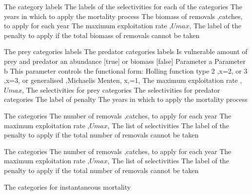 \par\textbf{}\par
{} {The category labels}
 {The labels of the selectivities for each of the categories}
 {The years in which to apply the mortality process}
 {The biomass of removals ,catches, to apply for each year}
 {The maximum exploitation rate ,$Umax$,}
 {The label of the penalty to apply if the total biomass of removals cannot be taken}
\par\textbf{}\par
{} {The prey categories labels}
 {The predator categories labels}
 {Is vulnerable amount of prey and predator an abundance [true] or biomass [false]}
 {Parameter a}
 {Parameter b}
 {This parameter controls the functional form: Holling function type 2 ,x=2, or 3 ,x=3, or generalised ,Michaelis Menten, x,=1,}
 {The maximum exploitation rate ,$Umax$,}
 {The selectivities for prey categories}
 {The selectivities for predator categories}
 {The label of penalty}
 {The years in which to apply the mortality process}
\par\textbf{}\par
{} {The categories}
 {The number of removals ,catches, to apply for each year}
 {The maximum exploitation rate ,$Umax$,}
 {The list of selectivities}
 {The label of the penalty to apply if the total number of removals cannot be taken}
\par\textbf{}\par
{} {The categories}
 {The number of removals ,catches, to apply for each year}
 {The maximum exploitation rate ,$Umax$,}
 {The list of selectivities}
 {The label of the penalty to apply if the total number of removals cannot be taken}
\par\textbf{}\par
{} {The categories for instantaneous mortality}
